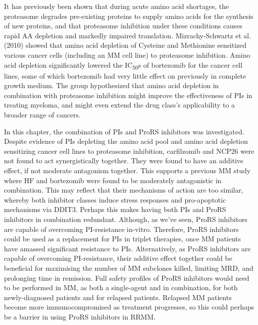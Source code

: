 It has previously been shown that during acute amino acid shortages, the proteasome degrades pre-existing proteins to supply amino acids for the synthesis of new proteins, and that proteasome inhibition under these conditions causes rapid AA depletion and markedly impaired translation\cite{vabulas2005protein}.
Mizrachy-Schwartz et al. (2010) showed that amino acid depletion of Cysteine and Methionine sensitized various cancer cells (including an MM cell line) to proteasome inhibition\cite{mizrachy2010amino}.
Amino acid depletion significantly lowered the IC\textsubscript{50}s of bortezomib for the cancer cell lines, some of which bortezomib had very little effect on previously in complete growth medium.
The group hypothesized that amino acid depletion in combination with proteasome inhibition might improve the effectiveness of PIs in treating myeloma, and might even extend the drug class's applicability to a broader range of cancers.

In this chapter, the combination of PIs and ProRS inhibitors was investigated.
Despite evidence of PIs depleting the amino acid pool and amino acid depletion sensitizing cancer cell lines to proteasome inhibition\cite{suraweera2012failure, mizrachy2010amino}, carfilzomib and NCP26 were not found to act synergistically together.
They were found to have an additive effect, if not moderate antagonism together.
This supports a previous MM study where HF and bortezomib were found to be moderately antagonistic in combination\cite{leiba2012halofuginone}.
This may reflect that their mechanisms of action are too similar, whereby both inhibitor classes induce stress responses and pro-apoptotic mechanisms via DDIT3.
Perhaps this makes having both PIs and ProRS inhibitors in combination redundant.
Although, as we've seen, ProRS inhibitors are capable of overcoming PI-resistance in-vitro.
Therefore, ProRS inhibitors could be used as a replacement for PIs in triplet therapies, once MM patients have amassed significant resistance to PIs.
Alternatively, as ProRS inhibitors are capable of overcoming PI-resistance, their additive effect together could be beneficial for maximising the number of MM subclones killed, limiting MRD, and prolonging time in remission.
Full safety profiles of ProRS inhibitors would need to be performed in MM, as both a single-agent and in combination, for both newly-diagnosed patients and for relapsed patients.
Relapsed MM patients become more immunocompromised as treatment progresses, so this could perhaps be a barrier in using ProRS inhibitors in RRMM.

